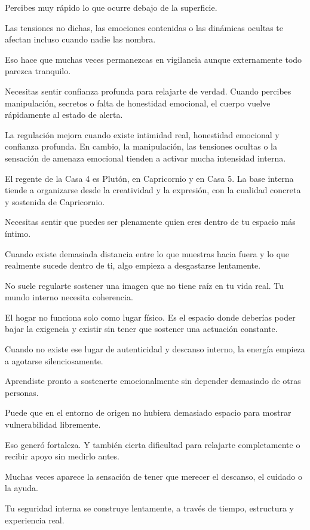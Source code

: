 \documentclass[11pt,a4paper]{article}
\begin{document}
Percibes muy rápido lo que ocurre debajo de la superficie.

Las tensiones no dichas, las emociones contenidas o las dinámicas ocultas te afectan incluso cuando nadie las nombra.

Eso hace que muchas veces permanezcas en vigilancia aunque externamente todo parezca tranquilo.

Necesitas sentir confianza profunda para relajarte de verdad. Cuando percibes manipulación, secretos o falta de honestidad emocional, el cuerpo vuelve rápidamente al estado de alerta.

La regulación mejora cuando existe intimidad real, honestidad emocional y confianza profunda. En cambio, la manipulación, las tensiones ocultas o la sensación de amenaza emocional tienden a activar mucha intensidad interna.

El regente de la Casa 4 es Plutón, en Capricornio y en Casa 5. La base interna tiende a organizarse desde la creatividad y la expresión, con la cualidad concreta y sostenida de Capricornio.

Necesitas sentir que puedes ser plenamente quien eres dentro de tu espacio más íntimo.

Cuando existe demasiada distancia entre lo que muestras hacia fuera y lo que realmente sucede dentro de ti, algo empieza a desgastarse lentamente.

No suele regularte sostener una imagen que no tiene raíz en tu vida real. Tu mundo interno necesita coherencia.

El hogar no funciona solo como lugar físico. Es el espacio donde deberías poder bajar la exigencia y existir sin tener que sostener una actuación constante.

Cuando no existe ese lugar de autenticidad y descanso interno, la energía empieza a agotarse silenciosamente.

Aprendiste pronto a sostenerte emocionalmente sin depender demasiado de otras personas.

Puede que en el entorno de origen no hubiera demasiado espacio para mostrar vulnerabilidad libremente.

Eso generó fortaleza. Y también cierta dificultad para relajarte completamente o recibir apoyo sin medirlo antes.

Muchas veces aparece la sensación de tener que merecer el descanso, el cuidado o la ayuda.

Tu seguridad interna se construye lentamente, a través de tiempo, estructura y experiencia real.
\end{document}
